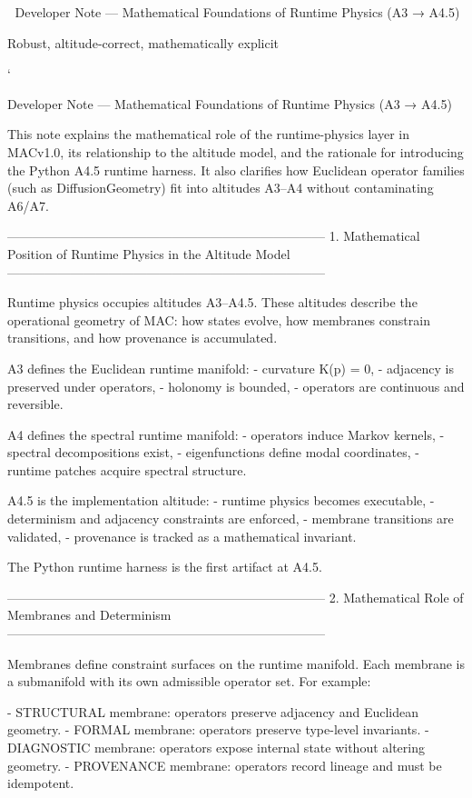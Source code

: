 📄 Developer Note — Mathematical Foundations of Runtime Physics (A3 → A4.5)

Robust, altitude‑correct, mathematically explicit

`

Developer Note — Mathematical Foundations of Runtime Physics (A3 → A4.5)

This note explains the mathematical role of the runtime-physics layer in MACv1.0,
its relationship to the altitude model, and the rationale for introducing the
Python A4.5 runtime harness. It also clarifies how Euclidean operator families
(such as DiffusionGeometry) fit into altitudes A3–A4 without contaminating A6/A7.

---------------------------------------------------------------------------
1. Mathematical Position of Runtime Physics in the Altitude Model
---------------------------------------------------------------------------

Runtime physics occupies altitudes A3–A4.5. These altitudes describe the
operational geometry of MAC: how states evolve, how membranes constrain
transitions, and how provenance is accumulated.

A3 defines the Euclidean runtime manifold:
- curvature K(p) = 0,
- adjacency is preserved under operators,
- holonomy is bounded,
- operators are continuous and reversible.

A4 defines the spectral runtime manifold:
- operators induce Markov kernels,
- spectral decompositions exist,
- eigenfunctions define modal coordinates,
- runtime patches acquire spectral structure.

A4.5 is the implementation altitude:
- runtime physics becomes executable,
- determinism and adjacency constraints are enforced,
- membrane transitions are validated,
- provenance is tracked as a mathematical invariant.

The Python runtime harness is the first artifact at A4.5.

---------------------------------------------------------------------------
2. Mathematical Role of Membranes and Determinism
---------------------------------------------------------------------------

Membranes define constraint surfaces on the runtime manifold. Each membrane
is a submanifold with its own admissible operator set. For example:

- STRUCTURAL membrane: operators preserve adjacency and Euclidean geometry.
- FORMAL membrane: operators preserve type-level invariants.
- DIAGNOSTIC membrane: operators expose internal state without altering geometry.
- PROVENANCE membrane: operators record lineage and must be idempotent.

